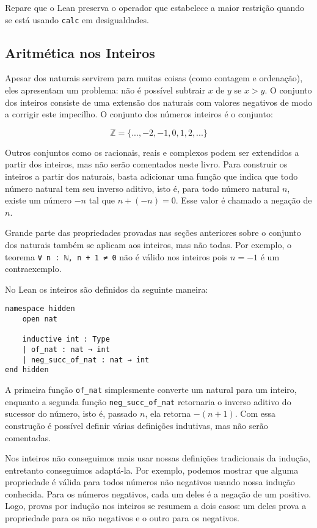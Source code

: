 \begin{center}
Repare que o Lean preserva o operador que estabelece a maior restrição quando se está usando \lstinline{calc} em desigualdades.

\subsection{Aritmética nos Inteiros}

Apesar dos naturais servirem para muitas coisas (como contagem e ordenação), eles apresentam um problema: não é possível subtrair $x$ de $y$ se $x > y$. O conjunto dos inteiros consiste de uma extensão dos naturais com valores negativos de modo a corrigir este impecilho. O conjunto dos números inteiros é o conjunto:

\[ \mathbb{Z} = \{...,-2,-1,0,1,2,...\}\]

Outros conjuntos como os racionais, reais e complexos podem ser extendidos a partir dos inteiros, mas não serão comentados neste livro. Para construir os inteiros a partir dos naturais, basta adicionar uma função que indica que todo número natural tem seu inverso aditivo, isto é, para todo número natural $n$, existe um número $-n$ tal que $n+(-n)=0$. Esse valor é chamado a negação de $n$.

Grande parte das propriedades provadas nas seções anteriores sobre o conjunto dos naturais também se aplicam aos inteiros, mas não todas. Por exemplo, o teorema \lstinline{∀ n : ℕ, n + 1 ≠ 0} não é válido nos inteiros pois $n=-1$ é um contraexemplo.

No Lean os inteiros são definidos da seguinte maneira:

\begin{lstlisting}
namespace hidden
    open nat

    inductive int : Type
    | of_nat : nat → int
    | neg_succ_of_nat : nat → int
end hidden
\end{lstlisting}

A primeira função \lstinline{of_nat} simplesmente converte um natural para um inteiro, enquanto a segunda função \lstinline{neg_succ_of_nat} retornaria o inverso aditivo do sucessor do número, isto é, passado $n$, ela retorna $-(n+1)$. Com essa construção é possível definir várias definições indutivas, mas não serão comentadas.

Nos inteiros não conseguimos mais usar nossas definições tradicionais da indução, entretanto conseguimos adaptá-la. Por exemplo, podemos mostrar que alguma propriedade é válida para todos números não negativos usando nossa indução conhecida. Para os números negativos, cada um deles é a negação de um positivo. Logo, provas por indução nos inteiros se resumem a dois casos: um deles prova a propriedade para os não negativos e o outro para os negativos.


\end{center}
